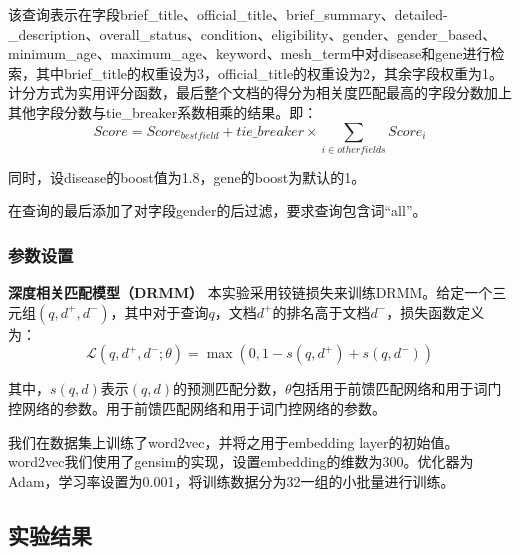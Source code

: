 \documentclass[a4paper]{article}
\begin{document}
该查询表示在字段brief\_title、official\_title、brief\_summary、detailed-\_description、overall\_status、condition、eligibility、gender、gender\_based、minimum\_age、maximum\_age、keyword、mesh\_term中对disease和gene进行检索，其中brief\_title的权重设为3，official\_title的权重设为2，其余字段权重为1。计分方式为实用评分函数，最后整个文档的得分为相关度匹配最高的字段分数加上其他字段分数与tie\_breaker系数相乘的结果。即：
\begin{equation}
    Score = Score_{best field} + tie\_breaker \times \sum_{i \in other fields} Score_i
\end{equation}

同时，设disease的boost值为1.8，gene的boost为默认的1。

在查询的最后添加了对字段gender的后过滤，要求查询包含词“all”。

\subsubsection{参数设置}

\textbf{深度相关匹配模型（DRMM）} 
本实验采用铰链损失来训练DRMM。给定一个三元组$(q, d^+, d^-)$，其中对于查询$q$，文档$d^+$的排名高于文档$d^-$，损失函数定义为：
\begin{equation}
    \mathcal{L}(q,d^+,d^-;\theta)=\max(0, 1-s(q,d^+)+s(q,d^-))
\end{equation}

其中，$s(q,d)$表示$(q,d)$的预测匹配分数，$\theta$包括用于前馈匹配网络和用于词门控网络的参数。用于前馈匹配网络和用于词门控网络的参数。

我们在数据集上训练了word2vec\cite{mikolov2013distributed}，并将之用于embedding layer的初始值。word2vec我们使用了gensim的实现，设置embedding的维数为300。优化器为Adam\cite{kingma2014adam}，学习率设置为0.001，将训练数据分为32一组的小批量进行训练。


\subsection{实验结果}
\end{document}

